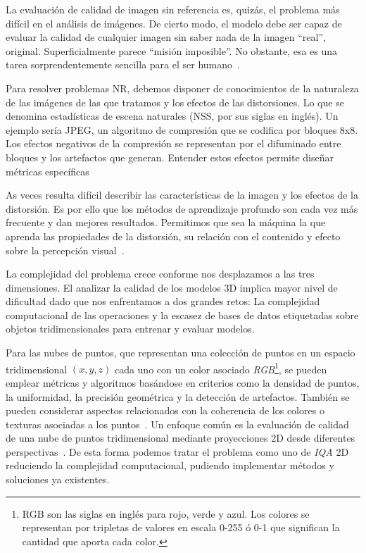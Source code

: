 La evaluación de calidad de imagen sin referencia es, quizás, el problema 
más difícil en el análisis de imágenes. De cierto modo, el modelo debe ser 
capaz de evaluar la calidad de cualquier imagen sin saber nada de la imagen ``real'', original. 
Superficialmente parece ``misión imposible''. No obstante, esa 
es una tarea sorprendentemente sencilla para el ser humano~\cite{Wang2006ModernIQ}. 

Para resolver problemas NR, debemos disponer de conocimientos de la naturaleza de las imágenes 
de las que tratamos y los efectos de las distorsiones. Lo que se denomina 
estadísticas de escena naturales (NSS, por sus siglas en inglés). Un ejemplo 
sería JPEG, un algoritmo de compresión que se codifica por bloques 8x8. Los efectos
negativos de la compresión se representan por el difuminado entre bloques y los artefactos que generan.
Entender estos efectos permite diseñar métricas específicas~\cite{SpatialDomainForJPEG}

As veces resulta difícil describir las características de la imagen y los efectos 
de la distorsión. Es por ello que los métodos de aprendizaje profundo son cada vez 
más frecuente y dan mejores resultados. Permitimos que sea la máquina la que aprenda 
las propiedades de la distorsión, su relación con el contenido y efecto sobre la 
percepción visual~\cite{Hallucinated-IQA, BIQA, DIPIQA}. 

La complejidad del problema crece conforme nos desplazamos a las tres dimensiones. 
El analizar la calidad de los modelos 3D implica mayor nivel de dificultad 
dado que nos enfrentamos a dos grandes retos: La complejidad computacional 
de las operaciones y la escasez de bases de datos etiquetadas
sobre objetos tridimensionales para entrenar y evaluar modelos. 

Para las nubes de puntos, que representan una colección de puntos en un espacio 
tridimensional $(x,y,z)$ cada uno con un color asociado \emph{RGB}\footnote{
  RGB son las siglas en inglés para rojo, verde y azul. Los colores se representan 
  por tripletas de valores en escala 0-255 ó 0-1 que significan la cantidad que aporta 
  cada color. 
}, se pueden emplear métricas y algoritmos basándose en criterios como la 
densidad de puntos, la uniformidad, la precisión geométrica y la detección de artefactos.
También se pueden considerar aspectos relacionados con la coherencia de los colores 
o texturas asociadas a los puntos~\cite{NR3DQA, SGR, GPA-NET}.
Un enfoque común es la evaluación de calidad de una nube de puntos tridimensional 
mediante proyecciones 2D desde diferentes perspectivas~\cite{IT-PCQA, VQA-PC, MM-PCQA}. 
De esta forma podemos tratar el problema como uno de \emph{IQA} 2D reduciendo la 
complejidad computacional, pudiendo implementar métodos y soluciones ya existentes.

